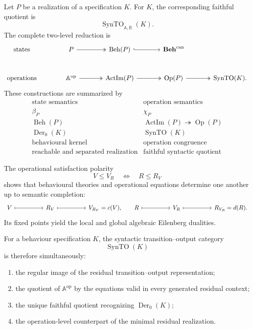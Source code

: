 Let \(P\) be a realization of a specification \(K\). For \(K\), the
corresponding faithful quotient is
\[
    \operatorname{SynTO}_{\mathbb A,\mathbb B}(K).
\]
The complete two-level reduction is
\[
\begin{tikzcd}[column sep=large, row sep=large]
    \text{states}
    &
    P
        \arrow[r, two heads]
    &
    \operatorname{Beh}(P)
        \arrow[r, hook]
    &
    \mathbf{Beh}^{\mathrm{can}}
    \\
    \text{operations}
    &
    \mathbb A^{\mathrm{op}}
        \arrow[r, two heads]
    &
    \operatorname{ActIm}(P)
        \arrow[r, two heads]
    &
    \operatorname{Op}(P)
        \arrow[r, two heads]
    &
    \operatorname{SynTO}(K).
\end{tikzcd}
\]
These constructions are summarized by
\[
\begin{array}{c|c}
\text{state semantics}
&
\text{operation semantics}
\\
\hline
\beta_P
&
\chi_P
\\[0.4em]
\operatorname{Beh}(P)
&
\operatorname{ActIm}(P)\twoheadrightarrow\operatorname{Op}(P)
\\[0.4em]
\operatorname{Der}_0(K)
&
\operatorname{SynTO}(K)
\\[0.4em]
\text{behavioural kernel}
&
\text{operation congruence}
\\[0.4em]
\text{reachable and separated realization}
&
\text{faithful syntactic quotient}
\end{array}
\]

The operational satisfaction polarity
\[
    V\leq V_R
    \quad\Longleftrightarrow\quad
    R\leq R_V
\]
shows that behavioural theories and operational equations determine one
another up to semantic completion:
\[
\begin{tikzcd}[column sep=huge]
    V
        \arrow[r, mapsto]
    &
    R_V
        \arrow[r, mapsto]
    &
    V_{R_V}=c(V),
    \qquad
    R
        \arrow[r, mapsto]
    &
    V_R
        \arrow[r, mapsto]
    &
    R_{V_R}=d(R).
\end{tikzcd}
\]
Its fixed points yield the local and global algebraic Eilenberg dualities.

For a behaviour specification \(K\), the syntactic transition--output category
\[
    \operatorname{SynTO}(K)
\]
is therefore simultaneously:
\begin{enumerate}
    \item the regular image of the residual transition--output
    representation;
    \item the quotient of \(\mathbb A^{\mathrm{op}}\) by the equations valid
    in every generated residual context;
    \item the unique faithful quotient recognizing
    \(\operatorname{Der}_0(K)\);
    \item the operation-level counterpart of the minimal residual realization.
\end{enumerate}

